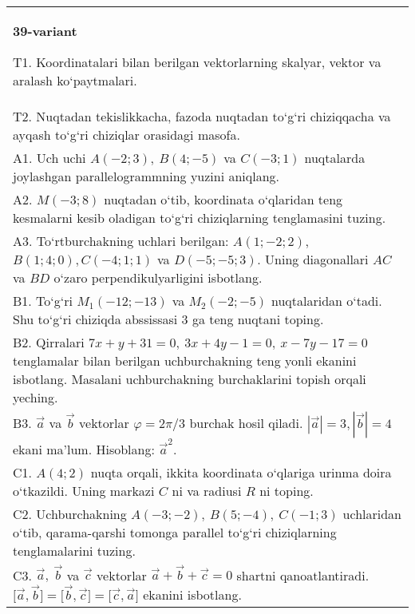 \documentclass{article}
\begin{document}
\begin{tabular}{m{17cm}}
\textbf{39-variant}
\newline

T1. 
Koordinatalari bilan berilgan vektorlarning skalyar, vektor va aralash ko‘paytmalari. \\
T2. 
Nuqtadan tekislikkacha, fazoda nuqtadan to‘g‘ri chiziqqacha va ayqash to‘g‘ri chiziqlar orasidagi masofa. \\
A1. 
Uch uchi $A (-2;3), \ B (4;-5) $ va
$C (-3;1)$ nuqtalarda joylashgan parallelogrammning yuzini aniqlang.
 \\
A2. 
$M (-3;8) $ nuqtadan o‘tib, koordinata o‘qlaridan
teng kesmalarni kesib oladigan to‘g‘ri chiziqlarning tenglamasini tuzing.
 \\
A3. 
To‘rtburchakning uchlari berilgan:
$A (1; - 2;2) $, $B (1;4;0),C (- 4;1;1) $ va $D (- 5; -5;3) $. Uning diagonallari $AC$ va $BD$ o‘zaro
perpendikulyarligini isbotlang.
 \\
B1. 
To‘g‘ri \(M_{1} (-12;-13) \) va \(M_{2} (-2;-5) \)
nuqtalaridan o‘tadi. Shu to‘g‘ri chiziqda abssissasi 3 ga teng nuqtani toping.
 \\
B2. 
Qirralari
\(7x+y+31=0,\ 3x+4y-1=0,\ x-7y-17=0\) tenglamalar
bilan berilgan uchburchakning teng yonli ekanini isbotlang.
Masalani uchburchakning
burchaklarini topish orqali yeching.
 \\
B3. 
$\vec{a}$ va $\vec{b}$ vektorlar $\varphi = 2\pi/3$ burchak hosil qiladi. $|\vec{a}| = 3,|\vec{b}| = 4$ ekani ma’lum. Hisoblang:
${\vec{a}}^{2}$.
 \\
C1. \(A (4;2) \) nuqta orqali, ikkita koordinata o‘qlariga
urinma doira o‘tkazildi. Uning markazi $C$ ni va radiusi
$R$ ni toping.
 \\
C2. 
Uchburchakning \(A (- 3; - 2),\ B (5; - 4),\ C (- 1;3) \)
uchlaridan o‘tib, qarama-qarshi tomonga parallel to‘g‘ri chiziqlarning tenglamalarini
tuzing.
 \\
C3. 
\(\vec{a},\ \vec{b}\) va \(\vec{c}\) vektorlar \(\vec{a} + \vec{b} + \vec{c} = 0\) shartni qanoatlantiradi. \(\lbrack\vec{a},\vec{b}\rbrack = \lbrack\vec{b},\vec{c}\rbrack = \lbrack\vec{c},\vec{a}\rbrack\) ekanini isbotlang.
 \\

\end{tabular}
\vspace{1cm}
\end{document}
